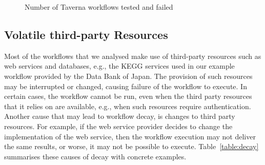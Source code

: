 \begin{figure}[h]
\centering
{}
\caption{Number of Taverna workflows tested and failed}
\label{fig:taverna-wf-failed}
\end{figure}


\subsection{Volatile third-party Resources}
Most of the workflows that we analysed make use of third-party resources such as web services and databases, e.g., the KEGG services used in our example workflow provided by the Data Bank of Japan.
The provision of such resources may be interrupted or changed, causing failure of the workflow to execute. In certain cases, the workflow cannot be run, even when the third party resources that it relies on are available, e.g.,  when such resources require authentication. Another cause that may lead to workflow decay, is changes to third party resources. For example, if the web service provider decides to change the implementation of the web service, then the workflow execution may not deliver the same results, or worse, it may not be possible to execute. Table~\ref{table:decay} summarises these causes of decay with concrete examples.


